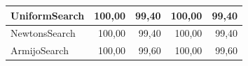 \documentclass[a4paper,english,titlepage,12pt]{article}
\begin{document}
\begin{table}[]
\begin{tabular}{|l|r|r|r|r|}
    UniformSearch                                                             & 100,00                                                   & \cellcolor[HTML]{F7D9D7}99,40                             & 100,00                                                    & \cellcolor[HTML]{F7D9D7}99,40                             \\ \hline
    NewtonsSearch                                                             & 100,00                                                   & \cellcolor[HTML]{F7D9D7}99,40                             & 100,00                                                    & \cellcolor[HTML]{F7D9D7}99,40                             \\ \hline
    ArmijoSearch                                                              & 100,00                                                   & 99,60                                                     & 100,00                                                    & 99,60                                                     \\ \hline
    \end{tabular}
\end{table}
\end{document}
